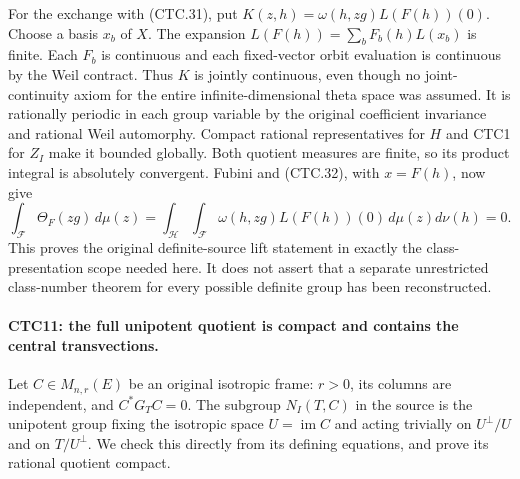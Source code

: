 For the exchange with (CTC.31), put
$K(z,h)=\omega(h,zg)L(F(h))(0)$.  Choose a basis $x_b$ of $X$.
The expansion $L(F(h))=\sum_b F_b(h)L(x_b)$ is finite.
Each $F_b$ is continuous and each fixed-vector orbit evaluation
is continuous by the Weil contract.  Thus $K$ is jointly
continuous, even though no joint-continuity axiom for the entire
infinite-dimensional theta space was assumed.  It is rationally
periodic in each group variable by the original coefficient
invariance and rational Weil automorphy.  Compact rational
representatives for $H$ and CTC1 for $Z_I$ make it bounded
globally.  Both quotient measures are finite, so its product
integral is absolutely convergent.  Fubini and (CTC.32), with
$x=F(h)$, now give
\[
 \int_{\mathcal F}\Theta_F(zg)\,d\mu(z)
 =\int_{\mathcal H}\int_{\mathcal F}
           \omega(h,zg)L(F(h))(0)\,d\mu(z)d\nu(h)=0.
 \tag{CTC.33}
\]
This proves the original definite-source lift statement in exactly
the class-presentation scope needed here.  It does not assert that
a separate unrestricted class-number theorem for every possible
definite group has been reconstructed.

\paragraph{CTC11: the full unipotent quotient is compact and contains the central transvections.}
\label{claim:CTC11}
Let $C\in M_{n,r}(E)$ be an original isotropic frame: $r>0$,
its columns are independent, and $C^*G_TC=0$.  The subgroup
$N_I(T,C)$ in the source is the unipotent group fixing the
isotropic space $U=\operatorname{im}C$ and acting trivially on
$U^\perp/U$ and on $T/U^\perp$.  We check this directly from
its defining equations, and prove its rational quotient compact.

